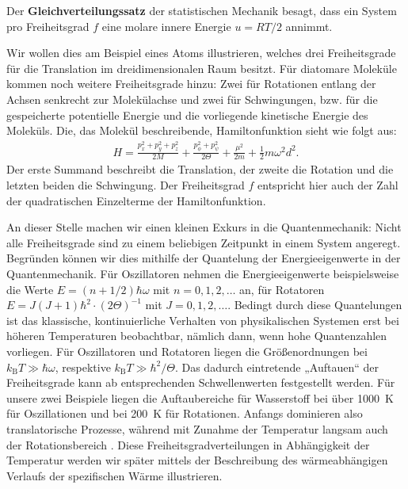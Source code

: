 \begin{formal}
    Der \textbf{Gleichverteilungssatz} der statistischen Mechanik besagt, dass ein System pro Freiheitsgrad $f$ eine molare innere Energie $u=RT/2$ annimmt.
\end{formal} 
Wir wollen dies am Beispiel eines Atoms illustrieren, welches drei Freiheitsgrade für die Translation im dreidimensionalen Raum besitzt. Für diatomare Moleküle kommen noch weitere Freiheitsgrade hinzu: Zwei für Rotationen entlang der Achsen senkrecht zur Molekülachse und zwei für Schwingungen, bzw. für die gespeicherte potentielle Energie und die vorliegende kinetische Energie des Moleküls.
Die, das Molekül beschreibende, Hamiltonfunktion sieht wie folgt aus: 
\begin{align*}
    H=\frac{p_x^2+p_y^2+p_z^2}{2M}+\frac{p_{\phi}^2+p_{\psi}^2}{2\Theta}+\frac{\mu^2}{2m}+\frac{1}{2}m\omega^2d^2.
\end{align*}
Der erste Summand beschreibt die Translation, der zweite die Rotation und die letzten beiden die Schwingung.
Der Freiheitsgrad $f$ entspricht hier auch der Zahl der quadratischen Einzelterme der Hamiltonfunktion.

An dieser Stelle machen wir einen kleinen Exkurs in die Quantenmechanik:
Nicht alle Freiheitsgrade sind zu einem beliebigen Zeitpunkt in einem System angeregt. Begründen können wir dies mithilfe der Quantelung der Energieeigenwerte in der Quantenmechanik.
Für Oszillatoren nehmen die Energieeigenwerte beispielsweise die Werte $E=(n+1/2)\hbar\omega$ mit $n=0,1,2,\ldots$ an, für Rotatoren $E=J(J+1)\hbar^2\cdot(2\Theta)^{-1}$ mit $J=0,1,2,\ldots$. 
Bedingt durch diese Quantelungen ist das klassische, kontinuierliche Verhalten von physikalischen Systemen erst bei höheren Temperaturen beobachtbar, nämlich dann, wenn hohe Quantenzahlen vorliegen. Für Oszillatoren und Rotatoren liegen die Größenordnungen bei $k_\mathrm{B}T\gg\hbar\omega $, respektive $k_\mathrm{B}T\gg\hbar^2/\Theta$. 
Das dadurch eintretende „Auftauen“ der Freiheitsgrade kann ab entsprechenden Schwellenwerten festgestellt werden. Für unsere zwei Beispiele liegen die Auftaubereiche für Wasserstoff bei über \SI{1000}{\kelvin} für Oszillationen und bei \SI{200}{\kelvin} für Rotationen.
Anfangs dominieren also translatorische Prozesse, während mit Zunahme der Temperatur langsam auch der Rotationsbereich . 
Diese Freiheitsgradverteilungen in Abhängigkeit der Temperatur werden wir später mittels der Beschreibung des wärmeabhängigen Verlaufs der spezifischen Wärme illustrieren.

